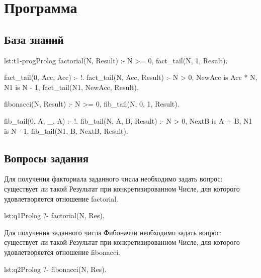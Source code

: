 \section{Программа}

\subsection{База знаний}
\begin{listing}{lst:t1-prog}{Prolog}
factorial(N, Result) :- 
    N >= 0,
    fact_tail(N, 1, Result).

fact_tail(0, Acc, Acc) :- !.
fact_tail(N, Acc, Result) :-
    N > 0,
    NewAcc is Acc * N,
    N1 is N - 1,
    fact_tail(N1, NewAcc, Result).


fibonacci(N, Result) :-
    N >= 0,
    fib_tail(N, 0, 1, Result).

fib_tail(0, A, _, A) :- !.
fib_tail(N, A, B, Result) :-
    N > 0,
    NextB is A + B,
    N1 is N - 1,
    fib_tail(N1, B, NextB, Result).
\end{listing}

\subsection{Вопросы задания}

Для получения факториала заданного числа необходимо задать вопрос: 
существует ли такой Результат при конкретизированном Числе, для которого 
удовлетворяется отношение factorial.

\begin{listing}{lst:q1}{Prolog}
?- factorial(N, Res).
\end{listing}

Для получения заданного числа Фибоначчи необходимо задать вопрос: существует
ли такой Результат при конкретизированном Числе, для которого 
удовлетворяется отношение fibonacci.

\begin{listing}{lst:q2}{Prolog}
?- fibonacci(N, Res).
\end{listing}
